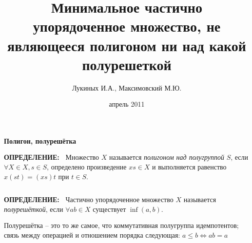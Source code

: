 \documentclass{beamer}
\title {Минимальное частично упорядоченное множество, не являющееся полигоном ни над какой полурешеткой}
\author{Лукиных И.А., Максимовский М.Ю.}
\date  {апрель 2011}
\newcommand{\green}{\color[rgb]{0,0.4,0}}
\newcommand{\blue}{\color{blue}}
\newcommand{\definit}{%
     {\bf \green ОПРЕДЕЛЕНИЕ:\ }}
\newcommand{\retline}{

$ $

}
\begin{document}

\maketitle


\begin{frame}
{\bf {\blue} Полигон, полурешётка}

{\definit}
Множество $X$ называется \textit{полигоном над полугруппой} $S$, если
$\forall X \in X, s \in S$, определено произведение
$xs \in X$ и выполняется равенство $x(st) = (xs)t$ при $t \in S$.
{\retline}

{\definit}
Частично упорядоченное множество $X$ называется \textit{полурешёткой},
если $\forall a b \in X$ существует $\inf (a, b)$. 

Полурешётка – это то же самое, что коммутативная полугруппа идемпотентов;
связь между операцией и отношением порядка следующая:
$a \leq b \iff ab = a$ 
\end{frame}
\end{document}
